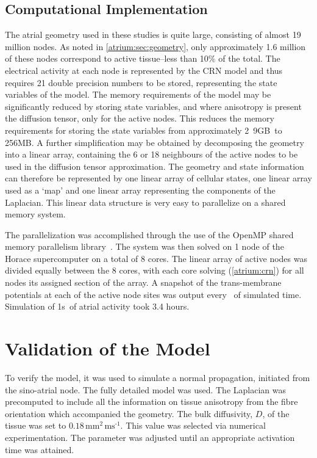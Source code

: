 \subsection{Computational Implementation}

The atrial geometry used in these studies is quite large, consisting of almost
19 million nodes.
As noted in \ref{atrium:sec:geometry}, only approximately 1.6 million of these
nodes correspond to active tissue--less than 10\% of the total.
The electrical activity at each node is represented by the CRN model and thus
requires 21 double precision numbers to be stored, representing the state
variables of the model.
The memory requirements of the model may be significantly reduced by storing
state variables, and where anisotropy is present the diffusion tensor, only for
the active nodes.
This reduces the memory requirements for storing the state variables from
approximately \unit{2.9}{GB}\ to \unit{256}{MB}.
A further simplification may be obtained by decomposing the geometry into a
linear array, containing the 6 or 18 neighbours of the active nodes to be used
in the diffusion tensor approximation.
The geometry and state information can therefore be represented by one linear
array of cellular states, one linear array used as a `map' and one
linear array representing the components of the Laplacian.
This linear data structure is very easy to parallelize on a shared memory
system.

The parallelization was accomplished through the use of the OpenMP shared
memory parallelism library~\cite{OpenMP}.
The system was then solved on 1 node of the Horace supercomputer on a total of 8
cores.
The linear array of active nodes was divided equally between the 8 cores, with
each core solving (\ref{atrium:crn}) for all nodes its assigned section of the
array.
A snapshot of the trans-membrane potentials at each of the active node sites was
output every \ of simulated time.
Simulation of \unit{1}{s}\ of atrial activity took 3.4 hours.

\section{Validation of the Model}

To verify the model, it was used to simulate a normal propagation, initiated
from the sino-atrial node.
The fully detailed model was used.
The Laplacian was precomputed to include all the information on tissue
anisotropy from the fibre orientation which accompanied the geometry.
The bulk diffusivity, $D$, of the tissue was set to $0.18\,\text{mm}^{\text{2}}\,\text{ms}^{\text{-1}}$.
This value was selected via numerical experimentation.
The parameter was adjusted until an appropriate activation time was attained.

